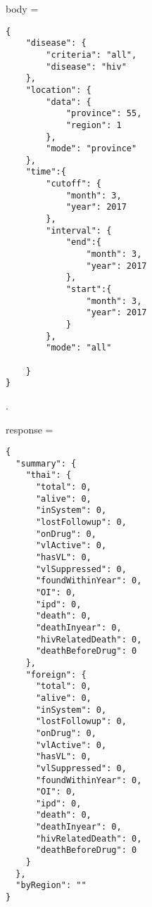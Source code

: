 \begin{multicols}{2}
body = 
\begin{verbatim}
{
	"disease": {
		"criteria": "all",
		"disease": "hiv"
	},
	"location": {
		"data": {
			"province": 55,
			"region": 1
		},
		"mode": "province"
	},
	"time":{
		"cutoff": {
			"month": 3,
			"year": 2017
		},
		"interval": {
			"end":{
				"month": 3,
				"year": 2017
			},
			"start":{
				"month": 3,
				"year": 2017
			}
		},
		"mode": "all"
		
	}
}
\end{verbatim}

.
\columnbreak

response =
\begin{verbatim}
{
  "summary": {
    "thai": {
      "total": 0,
      "alive": 0,
      "inSystem": 0,
      "lostFollowup": 0,
      "onDrug": 0,
      "vlActive": 0,
      "hasVL": 0,
      "vlSuppressed": 0,
      "foundWithinYear": 0,
      "OI": 0,
      "ipd": 0,
      "death": 0,
      "deathInyear": 0,
      "hivRelatedDeath": 0,
      "deathBeforeDrug": 0
    },
    "foreign": {
      "total": 0,
      "alive": 0,
      "inSystem": 0,
      "lostFollowup": 0,
      "onDrug": 0,
      "vlActive": 0,
      "hasVL": 0,
      "vlSuppressed": 0,
      "foundWithinYear": 0,
      "OI": 0,
      "ipd": 0,
      "death": 0,
      "deathInyear": 0,
      "hivRelatedDeath": 0,
      "deathBeforeDrug": 0
    }
  },
  "byRegion": ""
}
\end{verbatim}
\end{multicols}